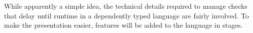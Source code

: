



While apparently a simple idea, the technical details required to manage checks that delay until runtime in a dependently typed language are fairly involved.
To make the presentation easier, features will be added to the language in stages.

